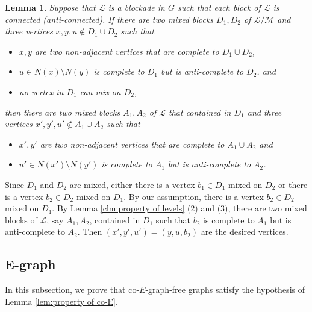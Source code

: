 \documentclass[a4paper,11pt]{article}
\newtheorem{lemma}[theorem]{Lemma}
\let\oldendproof\endproof
\renewenvironment{proof}[1][\proofname]{%
	\oldproof[\normalfont\bfseries #1]%
}{\oldendproof}
\begin{document}
        \begin{lemma}\label{clm:inductive}
            Suppose that $\mathcal{L}$ is a blockade in $G$ such that each block of $\mathcal{L}$ is connected (anti-connected). 
            If there are two mixed blocks $D_1,D_2$ of $\mathcal{L}/\mathcal{M}$ and three vertices $x,y,u\notin D_1\cup D_2$ such that 
            \begin{itemize}
                \item $x,y$ are two non-adjacent vertices that are complete to $D_1\cup D_2$,
                \item $u\in N(x)\setminus N(y)$ is complete to $D_1$ but is anti-complete to $D_2$, and
                \item no vertex in $D_1$ can mix on $D_2$,
            \end{itemize}
            then there are two mixed blocks $A_1,A_2$ of $\mathcal{L}$ that contained in $D_1$ and three vertices $x',y',u'\notin A_1\cup A_2$ such that 
            \begin{itemize}
                \item[$(1)$] $x',y'$ are two non-adjacent vertices that are complete to $A_1\cup A_2$ and
                \item[$(2)$] $u'\in N(x')\setminus N(y')$ is complete to $A_1$ but is anti-complete to $A_2$.  
            \end{itemize}
        \end{lemma}
        
        \begin{proof}
            Since $D_1$ and $D_2$ are mixed, either there is a vertex $b_1\in D_1$ mixed on $D_2$ or there is a vertex $b_2\in D_2$ mixed on $D_1$. By our assumption, 
            there is a vertex $b_2\in D_2$ mixed on $D_1$. 
            By Lemma \ref{clm:property of levels} (2) and (3), there are two mixed blocks of $\mathcal{L}$, say $A_1,A_2$, contained in $D_1$ such that $b_2$ is complete to $A_1$ but is anti-complete to $A_2$. 
            Then $(x',y',u')=(y,u,b_2)$ are the desired vertices.
        \end{proof}

    \subsection{E-graph}

    In this subsection, we prove that co-$E$-graph-free graphs satisfy the hypothesis of  Lemma \ref{lem:property of co-E}.
\end{document}
